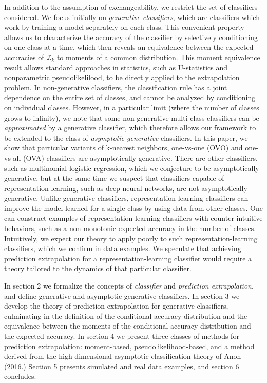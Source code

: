 \documentclass{article}
\begin{document}
In addition to the assumption of exchangeability, we restrict the set of classifiers considered.
We focus initially on \emph{generative classifiers}, which are classifiers which work by training
a model separately on each class.  This convenient property 
allows us to characterize the accuracy of the classifier by selectively conditioning on one class at a time,
which then reveals an equivalence between 
the expected accuracies of $\mathcal{Z}_k$ to moments of a common distribution.
This moment equivalence result allows standard approaches in statistics, such as U-statistics and
nonparametric pseudolikelilood, to be directly applied to the extrapolation problem.
In non-generative classifiers, the classification rule has a joint dependence on the entire set of classes,
and cannot be analyzed by conditioning on individual classes.
However, in a particular limit (where the number of classes grows to infinity), we note that
some non-generative multi-class classifiers can
be \emph{approximated} by a generative classifier, which therefore allows our framework
to be extended to the class of \emph{asymptotic generative} classifiers.
In this paper, we show that particular variants of k-nearest neighbors, one-vs-one (OVO) and one-vs-all (OVA) classifiers
are asymptotically generative.  There are other classifiers, such as multinomial logistic regression, which
we conjecture to be asymptotically generative, but at the same time we suspect that classifiers capable of representation learning, such as deep neural networks, are not asymptotically generative.  
Unlike generative classifiers, representation-learning classifiers can improve the model learned for a single class by using data from other classes.  One can construct examples of representation-learning classifiers with counter-intuitive behaviors, such 
as a non-monotonic expected accuracy in the number of classes.  Intuitively,
we expect our theory to apply poorly to such representation-learning classifiers,
which we confirm in data examples.  We speculate that achieving prediction extrapolation
for a representation-learning classifier would require a theory tailored to the dynamics of that particular classifier.

In section 2 we formalize the concepts of \emph{classifier} and \emph{prediction extrapolation},
and define generative and asymptotic generative classifiers.  In section 3 we develop the theory of prediction
extrapolation for generative classifiers, culminating in the definition of the conditional accuracy distribution
and the equivalence between the moments of the conditional accuracy distribution and the expected accuracy.
In section 4 we present three classes of methods for prediction extrapolation:
moment-based, pseudolikelihood-based, and a method derived from the high-dimensional asymptotic 
classification theory of Anon (2016.)  Section 5 presents simulated and real data examples, and section 6 concludes.
\end{document}
